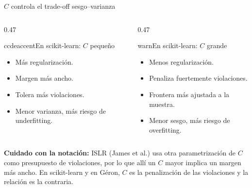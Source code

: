 \begin{frame}{$C$ controla el trade-off sesgo--varianza}
\small
\begin{columns}[T,onlytextwidth]
\begin{column}{0.47\textwidth}
\begin{contrastbox}{ccdeaccent}{En scikit-learn: $C$ pequeño}
\small
\begin{itemize}
  \item Más regularización.
  \item Margen más ancho.
  \item Tolera más violaciones.
  \item Menor varianza, más riesgo de underfitting.
\end{itemize}
\end{contrastbox}
\end{column}
\begin{column}{0.47\textwidth}
\begin{contrastbox}{warn}{En scikit-learn: $C$ grande}
\small
\begin{itemize}
  \item Menos regularización.
  \item Penaliza fuertemente violaciones.
  \item Frontera más ajustada a la muestra.
  \item Menor sesgo, más riesgo de overfitting.
\end{itemize}
\end{contrastbox}
\end{column}
\end{columns}
\vspace{0.22cm}
\begin{keybox}
\textbf{Cuidado con la notación:} ISLR (James et al.) usa otra parametrización de $C$ como presupuesto de violaciones, por lo que allí un $C$ mayor implica un margen más ancho. En scikit-learn y en Géron, $C$ es la penalización de las violaciones y la relación es la contraria.
\end{keybox}
\end{frame}

